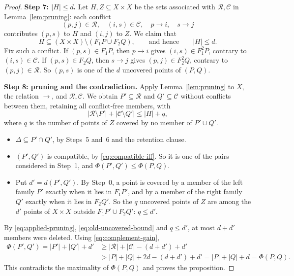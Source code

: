 \documentclass[11pt]{article}
\theoremstyle{remark}
\newcommand{\abs}[1]{\lvert #1\rvert}
\newcommand{\Step}[1]{\par\medskip\noindent\textbf{#1}\enspace}
\newcommand{\cR}{\mathcal R}
\newcommand{\cC}{\mathcal C}
\begin{document}
\begin{proof}
\Step{Step 7: $\abs H\le d$.}
Let $H,Z\subseteq X\times X$ be the sets associated with
$\mathcal R,\mathcal C$ in Lemma~\ref{lem:pruning}: each conflict
\[
 (p,j)\in\mathcal R,\quad (i,s)\in\mathcal C,\quad
 p\to i,\quad s\to j
\]
contributes $(p,s)$ to $H$ and $(i,j)$ to $Z$.
We claim that
\begin{equation}\label{eq:old-uncovered-bound}
 H\subseteq (X\times X)\setminus(F_1P\cup F_2Q),
 \qquad\text{and hence}\qquad \abs{H}\le d.
\end{equation}
Fix such a conflict. If $(p,s)\in F_1P$, then $p\to i$ gives
$(i,s)\in F_1^2P$, contrary to $(i,s)\in\mathcal C$.
If $(p,s)\in F_2Q$, then $s\to j$ gives $(p,j)\in F_2^2Q$, contrary to
$(p,j)\in\mathcal R$. So $(p,s)$ is one of the $d$ uncovered points of
$(P,Q)$.

\Step{Step 8: pruning and the contradiction.}
Apply Lemma~\ref{lem:pruning} to $X$, the relation $\to$, and
$\cR,\cC$. We obtain $P'\subseteq\mathcal R$ and $Q'\subseteq\mathcal C$
without conflicts between them, retaining all conflict-free members, with
\begin{equation}\label{eq:applied-pruning}
 \abs{\cR\setminus P'}+\abs{\cC\setminus Q'}\le\abs H+q,
\end{equation}
where $q$ is the number of points of $Z$ covered by no member of
$P'\cup Q'$.
\begin{itemize}[leftmargin=2em]
\item $\Delta\subseteq P'\cap Q'$, by Steps~5 and~6 and the retention
clause.
\item $(P',Q')$ is compatible, by \eqref{eq:compatible-iff}. So it is one
of the pairs considered in Step~1, and $\Phi(P',Q')\le\Phi(P,Q)$.
\item Put $d'=d(P',Q')$. By Step~0, a point is covered by a member of the
left family $P'$ exactly when it lies in $F_1P'$, and by a member of the
right family $Q'$ exactly when it lies in $F_2Q'$. So the $q$ uncovered
points of $Z$ are among the $d'$ points of $X\times X$ outside
$F_1P'\cup F_2Q'$: $q\le d'$.
\end{itemize}
By \eqref{eq:applied-pruning}, \eqref{eq:old-uncovered-bound} and
$q\le d'$, at most $d+d'$ members were deleted. Using
\eqref{eq:complement-gain},
\[
 \begin{aligned}
 \Phi(P',Q')=\abs{P'}+\abs{Q'}+d'
 &\ge \abs{\mathcal R}+\abs{\mathcal C}-(d+d')+d'\\
 &>\abs P+\abs Q+2d-(d+d')+d'=\abs P+\abs Q+d=\Phi(P,Q).
 \end{aligned}
\]
This contradicts the maximality of $\Phi(P,Q)$ and proves the proposition.
\end{proof}
\end{document}
